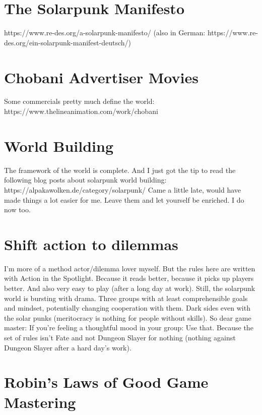 \section{The Solarpunk Manifesto}

https://www.re-des.org/a-solarpunk-manifesto/
(also in German: https://www.re-des.org/ein-solarpunk-manifest-deutsch/)

\section{Chobani Advertiser Movies}
Some commercials pretty much define the world: https://www.thelineanimation.com/work/chobani

\section{World Building}
The framework of the world is complete. And I just got the tip to read the following blog posts about solarpunk world building:
https://alpakawolken.de/category/solarpunk/
Came a little late, would have made things a lot easier for me. Leave them and let yourself be enriched. I do now too.

\section{Shift action to dilemmas}
I'm more of a method actor/dilemma lover myself. But the rules here are written with Action in the Spotlight. Because it reads
better, because it picks up players better. And also very easy to play (after a long day at work).
Still, the solarpunk world is bursting with drama. Three groups with at least comprehensible goals and mindset, potentially changing
cooperation with them. Dark sides even with the solar punks (meritocracy is nothing for people without skills).
So dear game master: If you're feeling a thoughtful mood in your group: Use that. Because the set of rules isn't Fate and not
Dungeon Slayer for nothing (nothing against Dungeon Slayer after a hard day's work).

\section{Robin's Laws of Good Game Mastering}

